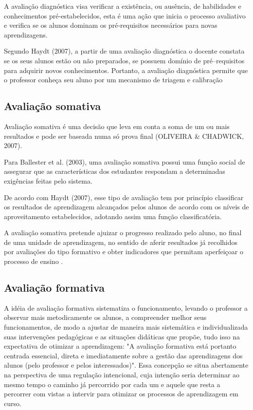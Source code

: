 \documentclass[
	12pt,				%
	openright,			%
	oneside,
	a4paper,			%
	english,			%
	french,				%
	spanish,			%
	brazil,				%
	]{abntex2}
\begin{document}
A avaliação diagnóstica visa verificar a existência, ou ausência, de
habilidades e conhecimentos pré‐estabelecidos, esta é uma ação que inicia o
processo avaliativo e verifica se os alunos dominam os pré‐requisitos necessários
para novas aprendizagens. \cite{bloom1983manual}

Segundo {\color{red}Haydt (2007)}, a partir de uma avaliação diagnóstica o docente constata se os seus alunos estão ou não preparados, se possuem domínio de pré–requisitos para adquirir novos conhecimentos. Portanto, a avaliação diagnóstica permite que o professor conheça seu aluno por um mecanismo de triagem e calibração

\subsection{Avaliação somativa}
\label{sec:AvaSom}
Avaliação somativa é uma decisão que leva em conta a soma de um ou mais resultados e pode ser baseada numa só prova final {\color{red}(OLIVEIRA & CHADWICK, 2007)}.

Para {\color{red}Ballester et al. (2003)}, uma avaliação somativa possui uma função social de assegurar que as características dos estudantes respondam a determinadas exigências feitas pelo sistema.

De acordo com {\color{red}Haydt (2007)}, esse tipo de avaliação tem por princípio classificar os resultados de aprendizagem alcançados pelos alunos de acordo com os níveis de aproveitamento estabelecidos, adotando assim uma função classificatória.

A avaliação somativa pretende ajuizar o progresso realizado pelo aluno, no final de uma unidade de aprendizagem, no sentido de aferir resultados já recolhidos por avaliações do tipo formativo e obter indicadores que permitam aperfeiçoar o processo de ensino \cite{kraemer2005avaliaccao}.

\subsection{Avaliação formativa}
\label{sec:AvaFor}
A idéia de avaliação formativa sistematiza o funcionamento, levando o professor a
observar mais metodicamente os alunos, a compreender melhor seus funcionamentos, de modo
a ajustar de maneira mais sistemática e individualizada suas intervenções pedagógicas e as
situações didáticas que propõe, tudo isso na expectativa de otimizar a aprendizagem: "A
avaliação formativa está portanto centrada essencial, direta e imediatamente sobre a gestão
das aprendizagens dos alunos (pelo professor e pelos interessados)". Essa concepção se situa
abertamente na perspectiva de uma regulação intencional, cuja intenção seria determinar ao
mesmo tempo o caminho já percorrido por cada um e aquele que resta a percorrer com vistas a
intervir para otimizar os processos de aprendizagem em curso. \cite{perrenoud1999avaliaccao}
\end{document}
